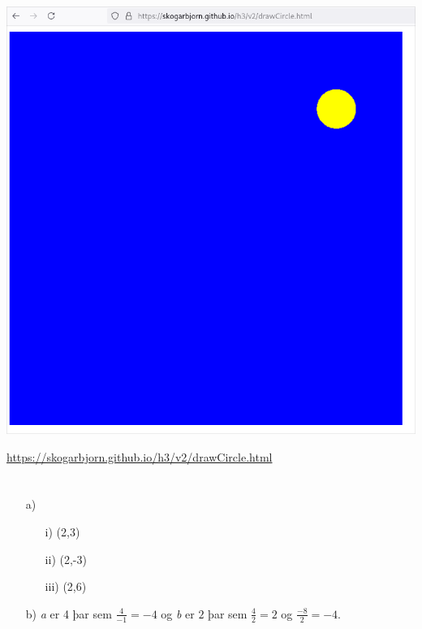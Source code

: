 \documentclass{article}
\begin{document}
	\section{}
	\begin{center}
		\includegraphics[scale=0.35]{movball.png}
	\end{center}
	\url{https://skogarbjorn.github.io/h3/v2/drawCircle.html}

	\section{}
	\begin{itemize}
		\item[a)] 
			\begin{itemize}
				\item[i)] (2,3)
				\item[ii)] (2,-3)
				\item[iii)] (2,6)
			\end{itemize}
		\item[b)] \textit{a} er 4 þar sem $\frac{4}{-1} = -4$ og \textit{b} 
			er $2$ þar sem $\frac{4}{2}= 2$ og $\frac{-8}{2} = -4$.
	\end{itemize}
\end{document}
